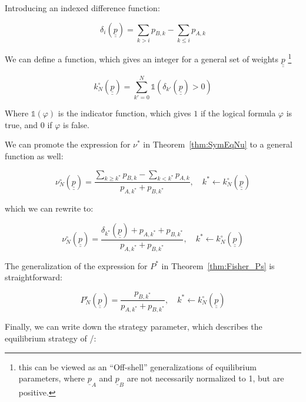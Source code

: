 \documentclass{article}
\theoremstyle{definition}
\begin{document}
Introducing an indexed difference function:

\begin{equation}
    \label{eq:delta_k}
    \delta_{i}(\underline{\underline{p}}) =  \sum_{k > i} p_{B,k} - \sum_{k \le i} p_{A,k}
\end{equation}


We can define a function, which gives an integer for a general set of weights $\underline{\underline{p}}$ \footnote{this can be viewed as an ``Off-shell'' \cite{book:Weinberg} generalizations of equilibrium parameters, where $\underline{p}_A$ and $\underline{p}_B$ are not necessarily normalized to 1, but are positive.}

\begin{equation}
    k^\circ_N(\underline{\underline{p}}) = \sum_{k'=0}^N 
    \mathds{1} \left ( \delta_{k'}(\underline{\underline{p}}) > 0 \right )
\end{equation}

Where $\mathds{1}(\varphi)$ is the indicator function, which gives $1$ if the logical formula $\varphi$ is true, and 0 if $\varphi$ is false.

We can promote the expression for $\nu^*$ in Theorem~\ref{thm:SymEqNu} to a general function as well:

\begin{equation}
    \nu^\circ_N(\underline{\underline{p}}) = \frac{\sum_{k\ge k^*} p_{B,k} - \sum_{k < k^*} p_{A,k}}{p_{A,k^*}+p_{B,k^*}}, \quad 
    k^* \leftarrow k^\circ_N(\underline{\underline{p}})
\end{equation}

which we can rewrite to:

\begin{equation}
    \label{eq:nuCirc}
    \nu^\circ_N(\underline{\underline{p}}) = \frac{
    \delta_{k^*}(\underline{\underline{p}}) +
    p_{A,k^*}+p_{B,k^*} }{p_{A,k^*}+p_{B,k^*}}, \quad 
    k^* \leftarrow k^\circ_N(\underline{\underline{p}})
\end{equation}

The generalization of the expression for $P^*$ in Theorem~\ref{thm:Fisher_Ps} is straightforward:

\begin{equation}
    P^\circ_N(\underline{\underline{p}}) = \frac{p_{B,k^*}}{p_{A,k^*}+p_{B,k^*}}, \quad 
    k^* \leftarrow k^\circ_N(\underline{\underline{p}})
\end{equation}

Finally, we can write down the strategy parameter, which describes the equilibrium strategy of \PI/:
\end{document}
